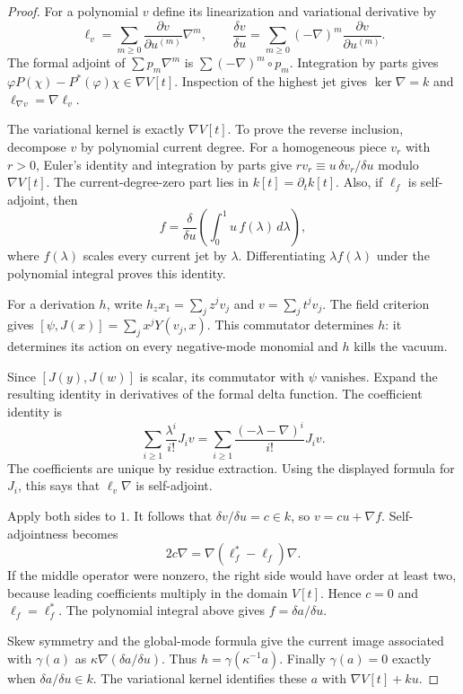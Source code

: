 \begin{proof}
For a polynomial $v$ define
its linearization and
variational derivative by
\[
 \ell_v=\sum_{m\geq0}
       \frac{\partial v}{\partial u^{(m)}}\nabla^m,
 \qquad
 \frac{\delta v}{\delta u}
 =\sum_{m\geq0}(-\nabla)^m
       \frac{\partial v}{\partial u^{(m)}}.
\]
The formal adjoint of
$\sum p_m\nabla^m$ is
$\sum(-\nabla)^m\circ p_m$.
Integration by parts
gives
$\varphi P(\chi)-P^*(\varphi)\chi
\in\nabla V[t]$.
Inspection of the highest
jet gives
$\ker\nabla=k$ and
$\ell_{\nabla v}=\nabla\ell_v$.

The variational kernel
is exactly $\nabla V[t]$.
To prove the reverse
inclusion, decompose
$v$ by polynomial current
degree. For a homogeneous
piece $v_r$ with $r>0$,
Euler's identity and
integration by parts
give
$rv_r\equiv u\,\delta v_r/\delta u$
modulo $\nabla V[t]$.
The current-degree-zero
part lies in
$k[t]=\partial_tk[t]$.
Also, if $\ell_f$ is
self-adjoint, then
\[
 f=\frac{\delta}{\delta u}
       \left(\int_0^1u\,f(\lambda)\,d\lambda\right),
\]
where $f(\lambda)$ scales
every current jet by
$\lambda$. Differentiating
$\lambda f(\lambda)$
under the polynomial
integral proves this
identity.

For a derivation $h$,
write $h_zx_1=\sum_jz^jv_j$
and $v=\sum_jt^jv_j$.
The field criterion
gives
$[\psi,J(x)]=\sum_jx^jY(v_j,x)$.
This commutator determines
$h$: it determines its
action on every negative-mode
monomial and $h$ kills
the vacuum.

Since $[J(y),J(w)]$ is
scalar, its commutator
with $\psi$ vanishes.
Expand the resulting
identity in derivatives
of the formal delta
function. The coefficient
identity is
\[
 \sum_{i\geq1}\frac{\lambda^i}{i!}J_iv
 =
 \sum_{i\geq1}
       \frac{(-\lambda-\nabla)^i}{i!}J_iv.
\]
The coefficients are
unique by residue
extraction. Using the
displayed formula for
$J_i$, this says that
$\ell_v\nabla$ is
self-adjoint.

Apply both sides to $1$.
It follows that
$\delta v/\delta u=c\in k$,
so $v=cu+\nabla f$.
Self-adjointness becomes
\[
 2c\nabla
 =\nabla(\ell_f^*-\ell_f)\nabla.
\]
If the middle operator
were nonzero, the
right side would have
order at least two,
because leading coefficients
multiply in the domain
$V[t]$. Hence $c=0$
and $\ell_f=\ell_f^*$.
The polynomial integral
above gives $f=\delta a/\delta u$.

Skew symmetry and the
global-mode formula give
the current image associated
with $\gamma(a)$ as
$\kappa\nabla(\delta a/\delta u)$.
Thus $h=\gamma(\kappa^{-1}a)$.
Finally $\gamma(a)=0$
exactly when
$\delta a/\delta u\in k$.
The variational kernel
identifies these $a$
with $\nabla V[t]+ku$.
\end{proof}

